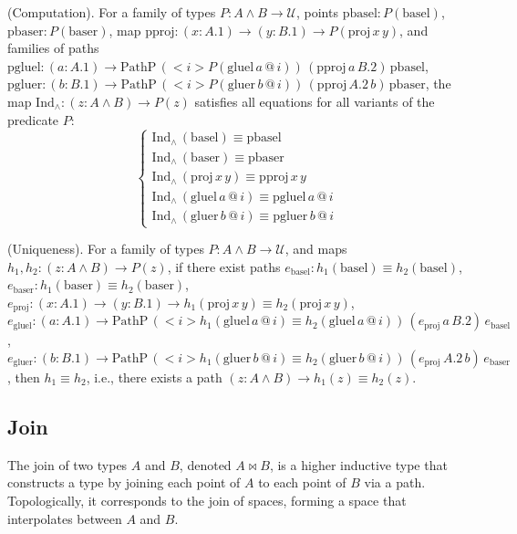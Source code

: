 \documentclass{article}
\begin{document}
\begin{theorem} (Computation).
For a family of types \( P : A \wedge B \to \mathcal{U} \),
points \( \text{pbasel} : P(\text{basel}) \),
\( \text{pbaser} : P(\text{baser}) \),
map \( \text{pproj} : (x : A.1) \to (y : B.1) \to P(\text{proj} \, x \, y) \),
and families of paths
\( \text{pgluel} : (a : A.1) \to \text{PathP} \, (<i> P(\text{gluel} \, a \, @ \, i)) \, (\text{pproj} \, a \, B.2) \, \text{pbasel} \),
\( \text{pgluer} : (b : B.1) \to \text{PathP} \, (<i> P(\text{gluer} \, b \, @ \, i)) \, (\text{pproj} \, A.2 \, b) \, \text{pbaser} \),
the map \( \text{Ind}_\wedge : (z : A \wedge B) \to P(z) \) satisfies all equations for all variants
of the predicate \( P \):
\[
\begin{cases}
\text{Ind}_\wedge \, (\text{basel}) \equiv \text{pbasel} \\
\text{Ind}_\wedge \, (\text{baser}) \equiv \text{pbaser} \\
\text{Ind}_\wedge \, (\text{proj} \, x \, y) \equiv \text{pproj} \, x \, y \\
\text{Ind}_\wedge \, (\text{gluel} \, a \, @ \, i) \equiv \text{pgluel} \, a \, @ \, i \\
\text{Ind}_\wedge \, (\text{gluer} \, b \, @ \, i) \equiv \text{pgluer} \, b \, @ \, i
\end{cases}
\]
\end{theorem}

\begin{theorem} (Uniqueness).
For a family of types \( P : A \wedge B \to \mathcal{U} \),
and maps \( h_1, h_2 : (z : A \wedge B) \to P(z) \),
if there exist paths
\( e_{\text{basel}} : h_1(\text{basel}) \equiv h_2(\text{basel}) \),
\( e_{\text{baser}} : h_1(\text{baser}) \equiv h_2(\text{baser}) \),
\( e_{\text{proj}} : (x : A.1) \to (y : B.1) \to h_1(\text{proj} \, x \, y) \equiv h_2(\text{proj} \, x \, y) \),
\( e_{\text{gluel}} : (a : A.1) \to \text{PathP} \, (<i> h_1(\text{gluel} \, a \, @ \, i) \equiv h_2(\text{gluel} \, a \, @ \, i)) \, (e_{\text{proj}} \, a \, B.2) \, e_{\text{basel}} \),
\( e_{\text{gluer}} : (b : B.1) \to \text{PathP} \, (<i> h_1(\text{gluer} \, b \, @ \, i) \equiv h_2(\text{gluer} \, b \, @ \, i)) \, (e_{\text{proj}} \, A.2 \, b) \, e_{\text{baser}} \),
then \( h_1 \equiv h_2 \), i.e., there exists a path \( (z : A \wedge B) \to h_1(z) \equiv h_2(z) \).
\end{theorem}

\newpage
\subsection{Join}
The join of two types \( A \) and \( B \), denoted \( A \Join B \),
is a higher inductive type that constructs a type by
joining each point of \( A \) to each point of \( B \) via a path.
Topologically, it corresponds to the join of spaces, forming
a space that interpolates between \( A \) and \( B \).
\end{document}
